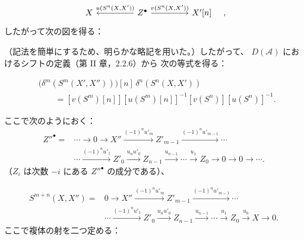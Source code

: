 \clearpage
{}%
\begingroup\small\setlength{\parskip}{0pt}\setlength{\emergencystretch}{1.5em}
\setlength{\abovedisplayskip}{4pt plus 2pt minus 2pt}%
\setlength{\belowdisplayskip}{4pt plus 2pt minus 2pt}%

\[
\begin{tikzcd}[column sep=4.5em]
X & Z^\bullet
  \arrow[l,"{u(S^n(X,X'))}"']
  \arrow[r,"{v(S^n(X,X'))}"]
& X'[n]
\end{tikzcd}
\quad,
\]
したがって次の図を得る：

\begin{center}
\end{center}
（記法を簡単にするため、明らかな略記を用いた。）したがって、
$D(\mathcal A)$ におけるシフトの定義（第 II 章，2.2.6）から
次の等式を得る：

\begin{equation}
\begin{aligned}
&\bigl(\delta^m(S^m(X',X''))\bigr)[n]\,
  \delta^n(S^n(X,X'))\\
&\qquad={}
[v(S^m)[n]][u(S^m)[n]]^{-1}[v(S^n)][u(S^n)]^{-1}.
\end{aligned}
\tag{3.2.5.1}
\end{equation}

ここで次のようにおく：
\begin{equation}
\begin{aligned}
Z''^\bullet={}&\cdots\longrightarrow0\longrightarrow X''
\xrightarrow{(-1)^n u'_m}Z'_{m-1}
\xrightarrow{(-1)^n u'_{m-1}}\cdots\\
&\cdots\xrightarrow{(-1)^n u'_1}Z'_0
\xrightarrow{u_nu'_0}Z_{n-1}
\xrightarrow{u_{n-1}}\cdots\xrightarrow{u_1}Z_0
\longrightarrow0\longrightarrow0\longrightarrow\cdots.
\end{aligned}
\tag{3.2.5.2}
\end{equation}
（$Z_i$ は次数 $-i$ にある $Z''^\bullet$ の成分である）、

\[
\begin{aligned}
S^{m+n}(X,X'')={}&0\longrightarrow X''
\xrightarrow{(-1)^n u'_m}Z'_{m-1}
\xrightarrow{(-1)^n u'_{m-1}}\cdots\\
&\cdots\xrightarrow{(-1)^n u'_1}Z'_0
\xrightarrow{u_nu'_0}Z_{n-1}
\xrightarrow{u_{n-1}}\cdots\xrightarrow{u_1}Z_0
\xrightarrow{u_0}X\longrightarrow0.
\end{aligned}
\]
ここで複体の射を二つ定める：

